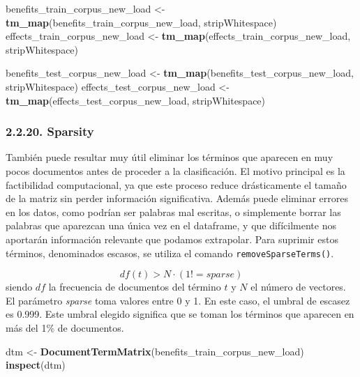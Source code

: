 \documentclass[spanish,]{article}
\newenvironment{Shaded}{\begin{snugshade}}{\end{snugshade}}
\newcommand{\KeywordTok}[1]{\textcolor[rgb]{0.13,0.29,0.53}{\textbf{#1}}}
\newcommand{\StringTok}[1]{\textcolor[rgb]{0.31,0.60,0.02}{#1}}
\newcommand{\NormalTok}[1]{#1}
\begin{document}
\begin{Shaded}
\begin{Highlighting}[]
\NormalTok{benefits_train_corpus_new_load <-}\StringTok{ }\KeywordTok{tm_map}\NormalTok{(benefits_train_corpus_new_load, stripWhitespace) }
\NormalTok{effects_train_corpus_new_load <-}\StringTok{ }\KeywordTok{tm_map}\NormalTok{(effects_train_corpus_new_load, stripWhitespace) }

\NormalTok{benefits_test_corpus_new_load <-}\StringTok{ }\KeywordTok{tm_map}\NormalTok{(benefits_test_corpus_new_load, stripWhitespace) }
\NormalTok{effects_test_corpus_new_load <-}\StringTok{ }\KeywordTok{tm_map}\NormalTok{(effects_test_corpus_new_load, stripWhitespace) }
\end{Highlighting}
\end{Shaded}

\subsubsection{2.2.20. Sparsity}\label{sparsity}

También puede resultar muy útil eliminar los términos que aparecen en
muy pocos documentos antes de proceder a la clasificación. El motivo
principal es la factibilidad computacional, ya que este proceso reduce
drásticamente el tamaño de la matriz sin perder información
significativa. Además puede eliminar errores en los datos, como podrían
ser palabras mal escritas, o simplemente borrar las palabras que
aparezcan una única vez en el dataframe, y que difícilmente nos
aportarán información relevante que podamos extrapolar. Para suprimir
estos términos, denominados escasos, se utiliza el comando
\texttt{removeSparseTerms()}.

\[ df(t) > N \cdot (1 != sparse)\] siendo \(df\) la frecuencia de
documentos del término \(t\) y \(N\) el número de vectores. El parámetro
\emph{sparse} toma valores entre 0 y 1. En este caso, el umbral de
escasez es 0.999. Este umbral elegido significa que se toman los
términos que aparecen en más del 1\% de documentos.

\begin{Shaded}
\begin{Highlighting}[]
\NormalTok{dtm <-}\StringTok{ }\KeywordTok{DocumentTermMatrix}\NormalTok{(benefits_train_corpus_new_load)}
\KeywordTok{inspect}\NormalTok{(dtm)}
\end{Highlighting}
\end{Shaded}
\end{document}
